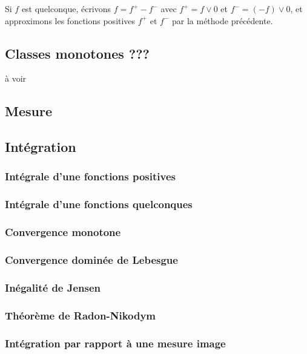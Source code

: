 Si $f$ est quelconque, écrivons $f = f^+ - f^-$ avec $f^+ = f \lor 0$ et $f^- = (-f) \lor 0$, et approximons les fonctions positives $f^+$ et $f^-$ par la méthode précédente.
\epf
    
\subsection{Classes monotones ???}
à voir

\subsection{Mesure}

\bd[Axiomes]
\ed

\bp
\ep

\ed


\bigskip

\subsection{Intégration}
\subsubsection{Intégrale d'une fonctions positives}

\subsubsection{Intégrale d'une fonctions quelconques}

\subsubsection{Convergence monotone}

\subsubsection{Convergence dominée de Lebesgue}

\subsubsection{Inégalité de Jensen}

\subsubsection{Théorème de Radon-Nikodym}

\subsubsection{Intégration par rapport à une mesure image}

